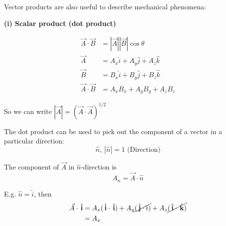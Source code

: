 \documentclass[10pt]{scrartcl}
\begin{document}
 Vector products are also useful to describe mechanical phenomena: 

\textbf{(i) Scalar product (dot product)}

\begin{center}
  \end{center}

\[\begin{aligned}
\vec{A} \cdot \vec{B} &= |\vec{A}||\vec{B}|\cos \theta\\
\vec{A} &= A_x\hat{i} + A_y\hat{j} + A_z\hat{k}\\
\vec{B} &= B_x\hat{i} + B_y\hat{j} + B_z\hat{k}\\
\vec{A}\cdot \vec{B} &= A_xB_x + A_yB_y + A_zB_z
\end{aligned}
\]

So we can write $|\vec{A}| = (\vec{A}\cdot\vec{A})^{1/2}$

The dot product can be used to pick out the component of a vector in a particular direction:
\[\hat{n},~|\hat{n}| = 1 \text{ (Direction)}\]

The component of $\vec{A}$ in $\hat{n}$-direction is 
\[A_n = \vec{A}\cdot\hat{n}\]

E.g. $\hat{n} = \hat{i}$, then 
\[\begin{aligned}
\vec{A}\cdot\hat{i} &= A_x(\hat{i}\cdot\hat{i}) + A_y\cancel{(\hat{j}\cdot{i})} + A_z\cancel{(\hat{i} \cdot\hat{k})}\\
&= A_x
\end{aligned}
\]~
\end{document}
